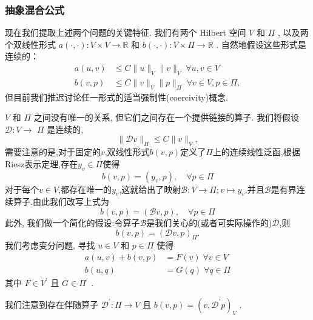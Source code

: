 \subsubsection{抽象混合公式}
现在我们提取上述两个问题的关键特征. 我们有两个 Hilbert 空间 $V$ 和 $\varPi$ , 以及两个双线性形式 $a\left( {\cdot , \cdot  }\right)  : V \times  V \rightarrow  \mathbb{R}$ 和 $b\left( {\cdot , \cdot  }\right)  : V \times  \varPi  \rightarrow  \mathbb{R}$ . 自然地假设这些形式是连续的：
\begin{equation}\label{eq:12.2.1}
\begin{aligned}
a\left( {u,v}\right)  &\leq  C\| u\|_{V}\| v\|_{V}\;\forall u,v \in  V \\
b\left( {v,p}\right)  &\leq  C\| v\|_{V}\| p\|_{\varPi }\;\forall v \in  V,p \in  \varPi ,
\end{aligned}
\end{equation}
但目前我们推迟讨论任一形式的适当强制性(coercivity)概念.\par
$V$ 和 $\varPi$ 之间没有唯一的关系, 但它们之间存在一个提供链接的算子. 我们将假设 $\mathcal{D} : V \rightarrow$  $\varPi$ 是连续的, 
\begin{equation}\label{eq:12.2.2}
\| \mathcal{D}v\|_{\varPi } \leq  C\| v\|_{V},
\end{equation}
需要注意的是,对于固定的$v$,双线性形式$b(v,p)$定义了$\varPi$上的连续线性泛函,根据Riesz表示定理,存在$y_v\in \varPi$使得
$$
b(v,p)=(y_v,p),\quad \forall p\in\varPi
$$
对于每个$v\in V$,都存在唯一的$y_v$,这就给出了映射$\mathcal{B}:V\to \varPi;v\mapsto y_v$.并且$\mathcal{B}$是有界连续算子.由此我们改写上式为
$$
b(v,p)=(\mathcal{B}v,p),\quad \forall p\in\varPi
$$
\qquad 此外, 我们做一个简化的假设:令算子$\mathcal{B}$是我们关心的(或者可实际操作的)$\mathcal{D}$,则
\begin{equation}\label{eq:12.2.3}
b\left( {v,p}\right)  = {\left( \mathcal{D}v,p\right) }_{\varPi }.
\end{equation}
\qquad 我们考虑变分问题, 寻找 $u \in  V$ 和 $p \in  \varPi$ 使得
\begin{equation}\label{eq:12.2.4}
\begin{aligned}
a\left( {u,v}\right)  + b\left( {v,p}\right)  &= F\left( v\right) \;\forall v \in  V \\
b\left( {u,q}\right)  &= G\left( q\right) \;\forall q \in  \varPi
\end{aligned}
\end{equation}
其中 $F \in  {V}^{\prime }$ 且 $G \in  {\varPi }^{\prime }$ .\par
我们注意到存在伴随算子 ${\mathcal{D}}^{\prime } : \varPi  \rightarrow  V$ 且 $b\left( {v,p}\right)  = {\left( v,{\mathcal{D}}^{\prime }p\right) }_{V}$ .\par
